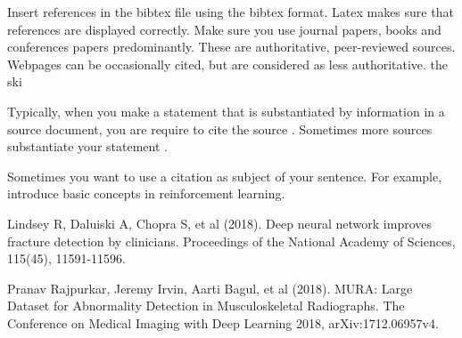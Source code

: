 \documentclass[12pt,oneside,a4paper]{article}
\begin{document}
Insert references in the bibtex file using the bibtex format. Latex makes sure that references are displayed correctly. Make sure you use journal papers, books and conferences papers predominantly. These are authoritative, peer-reviewed sources. Webpages can be occasionally cited, but are considered as less authoritative.
the ski

Typically, when you make a statement that is substantiated by information in a source document, you are require to cite the source \citep{bullinaria2009}. Sometimes more sources substantiate your statement \citep{soltoggioSteilNeuralComputation2013,soltoggioHTP2014}. 

Sometimes you want to use a citation as subject of your sentence. For example, \citet{SuttonBarto1998} introduce basic concepts in reinforcement learning.






Lindsey  R,  Daluiski  A,  Chopra  S,  et al  (2018).  Deep  neural  network  improves fracture  detection  by  clinicians.  Proceedings  of  the  National  Academy  of Sciences, 115(45), 11591-11596.  

Pranav Rajpurkar, Jeremy Irvin, Aarti Bagul, et al (2018). MURA: Large Dataset for Abnormality Detection in Musculoskeletal Radiographs. The Conference on Medical Imaging with Deep Learning 2018, arXiv:1712.06957v4. 
\end{document}
